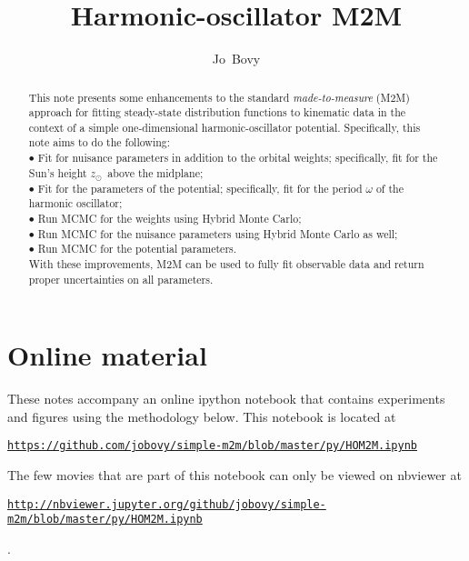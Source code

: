 \documentclass[12pt,preprint]{aastex}
\newcounter{address}
\newcommand{\zsun}{\ensuremath{z_\odot}}
\begin{document}
\title{Harmonic-oscillator M2M}
\author{Jo~Bovy}

\begin{abstract} 
  This note presents some enhancements to the standard
  \emph{made-to-measure} (M2M) approach for fitting steady-state
  distribution functions to kinematic data in the context of a simple
  one-dimensional harmonic-oscillator potential. Specifically, this
  note aims to do the following:\\
  $\bullet$ Fit for nuisance parameters in addition to the orbital
  weights; specifically, fit for the Sun's height \zsun\ above the
  midplane;\\ $\bullet$ Fit for the parameters of the potential;
  specifically, fit for the period $\omega$ of the harmonic
  oscillator;\\ $\bullet$ Run MCMC for the weights using Hybrid Monte
  Carlo;\\ $\bullet$ Run MCMC for the nuisance parameters using Hybrid
  Monte Carlo as well;\\ $\bullet$ Run MCMC for the potential
  parameters.\\
  With these improvements, M2M can be used to fully fit observable
  data and return proper uncertainties on all parameters.
\end{abstract}

\section{Online material}

These notes accompany an online ipython notebook that contains
experiments and figures using the methodology below. This notebook is
located at
\\ \centerline{\texttt{\url{https://github.com/jobovy/simple-m2m/blob/master/py/HOM2M.ipynb}}}
The few movies that are part of this notebook can only be viewed on nbviewer at
\\ \centerline{\footnotesize \texttt{\url{http://nbviewer.jupyter.org/github/jobovy/simple-m2m/blob/master/py/HOM2M.ipynb}}}.
\end{document}
